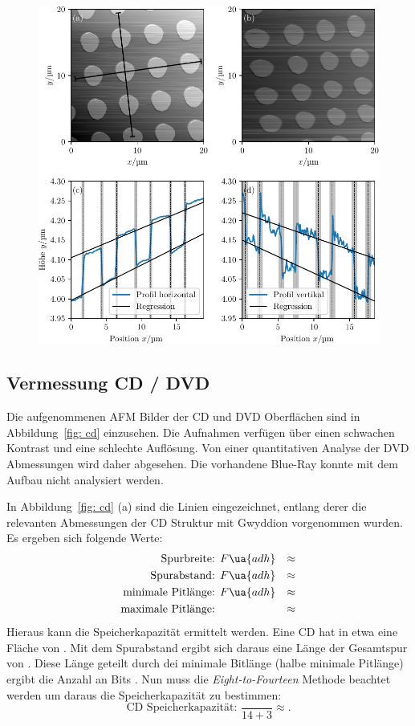 \begin{figure}
  \centering
  \includegraphics[scale = 1]{../analysis/data/nanostruktur_kreise/kreise_profile.pdf}
  \caption{}
  \label{fig: kreise_profil}
\end{figure}

\subsection{Vermessung CD / DVD}
Die aufgenommenen AFM Bilder der CD und DVD Oberflächen sind in Abbildung~\ref{fig: cd} einzusehen.
Die Aufnahmen verfügen über einen schwachen Kontrast und eine schlechte Auflösung. Von einer
quantitativen Analyse der DVD Abmessungen wird daher abgesehen. Die vorhandene Blue-Ray
konnte mit dem Aufbau nicht analysiert werden.

In Abbildung~\ref{fig: cd} (a) sind die Linien eingezeichnet, entlang derer die relevanten Abmessungen der
CD Struktur mit Gwyddion vorgenommen wurden. Es ergeben sich folgende Werte:
\begin{align}
  \begin{aligned}
    \text{Spurbreite: } & F\ua{adh} &\approx \\
    \text{Spurabstand: } & F\ua{adh}       &\approx \\
    \text{minimale Pitlänge: } & F\ua{adh}    &\approx \\
    \text{maximale Pitlänge: } & &\approx
  \end{aligned}
\end{align}
Hieraus kann die Speicherkapazität ermittelt werden. Eine CD hat in etwa eine Fläche von . Mit dem Spurabstand ergibt sich daraus
eine Länge der Gesamtspur von . Diese Länge geteilt durch dei minimale Bitlänge (halbe minimale Pitlänge) ergibt die Anzahl an Bits .
Nun muss die \textit{Eight-to-Fourteen}
Methode beachtet werden um daraus die Speicherkapazität zu bestimmen:
\begin{equation}
  \text{CD Speicherkapazität: } \frac{}{14 + 3} \approx.
\end{equation}


